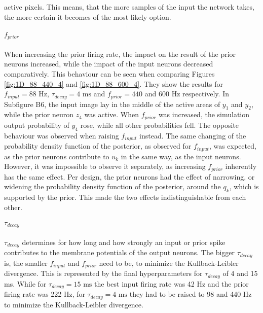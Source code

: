 active pixels. This means, that the more samples of the input the network takes, the more certain it becomes of the most likely option.

\paragraph{$f_{prior}$} When increasing the prior firing rate, the impact on the result of the prior neurons increased, while the impact of the input neurons decreased comparatively. This behaviour can be seen when comparing Figures \ref{fig:1D_88_440_4} and \ref{fig:1D_88_600_4}. They show the results for $f_{input} = 88\text{ Hz}$, $\tau_{decay} = 4\text{ ms}$ and $f_{prior} = 440$ and $600\text{ Hz}$ respectively. In Subfigure B6, the input image lay in the middle of the active areas of $y_1$ and $y_2$, while the prior neuron $z_4$ was active. When $f_{prior}$ was increased, the simulation output probability of $y_4$ rose, while all other probabilities fell. The opposite behaviour was observed when raising $f_{input}$ instead. The same changing of the probability density function of the posterior, as observed for $f_{input}$, was expected, as the prior neurons contribute to $u_k$ in the same way, as the input neurons. However, it was impossible to observe it separately, as increasing $f_{prior}$ inherently has the same effect. Per design, the prior neurons had the effect of narrowing, or widening the probability density function of the posterior, around the $q_k$, which is supported by the prior. This made the two effects indistinguishable from each other.

\paragraph{$\tau_{decay}$} $\tau_{decay}$ determines for how long and how strongly an input or prior spike contributes to the membrane potentials of the output neurons. The bigger $\tau_{decay}$ is, the smaller $f_{input}$ and $f_{prior}$ need to be, to minimize the Kullback-Leibler divergence. This is represented by the final hyperparameters for $\tau_{decay}$ of 4 and 15 ms. While for $\tau_{decay} = 15\text{ ms}$ the best input firing rate was 42 Hz and the prior firing rate was 222 Hz, for $\tau_{decay} = 4\text{ ms}$ they had to be raised to 98 and 440 Hz to minimize the Kullback-Leibler divergence.

